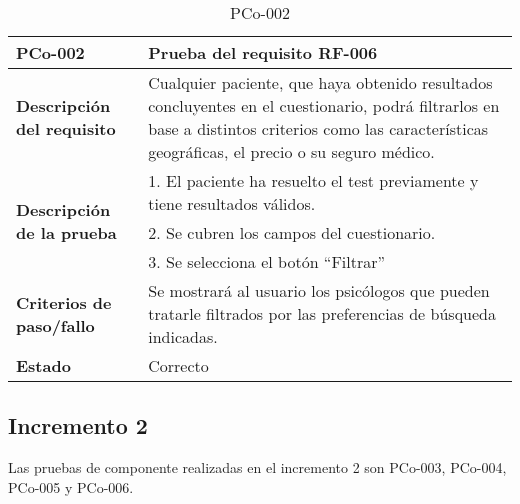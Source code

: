 \begin{table}[htpb]
\centering
\begin{tabularx}{\textwidth}{|l|X|}
\hline
\textbf{PCo-002}                                     & \textbf{Prueba del requisito RF-006}                                                                                                                                                                  \\ \hline
\textbf{Descripción del requisito}                  & Cualquier paciente, que haya obtenido resultados concluyentes en el cuestionario, podrá  filtrarlos en base a distintos criterios como las características geográficas, el precio o su seguro médico. \\ \hline
\multirow{3}{*}{\textbf{Descripción de la prueba}} & 1. El paciente ha resuelto el test previamente y tiene resultados válidos.                                                                                                                            \\ \cline{2-2} 
                                                   & 2. Se cubren los campos del cuestionario.                                                                                                                                                             \\ \cline{2-2} 
                                                   & 3. Se selecciona el botón ``Filtrar''
\\ \hline
\textbf{Criterios de paso/fallo}                   & Se mostrará al usuario los psicólogos que pueden tratarle filtrados por las preferencias de búsqueda indicadas.                                                                                       \\ \hline
\textbf{Estado}                                    & Correcto                                                                                                                                                                                              \\ \hline
\end{tabularx}
\caption{PCo-002}
\end{table}


\subsection{Incremento 2}

Las pruebas de componente realizadas en el incremento 2 son PCo-003, PCo-004, PCo-005 y PCo-006.

